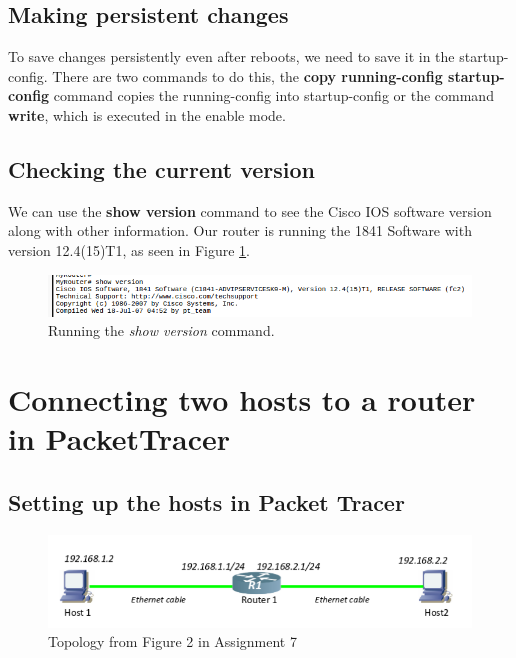 \documentclass{article}
\begin{document}
\subsection{Making persistent changes}
To save changes persistently even after reboots, we need to save it in the startup-config. There are two commands to do this, the \textbf{copy running-config startup-config} command copies the running-config into startup-config or the command \textbf{write}, which is executed in the enable mode. 

\subsection{Checking the current version}
We can use the \textbf{show version} command to see the Cisco IOS software version along with other information. Our router is running the 1841 Software with version 12.4(15)T1, as seen in Figure \ref{fig:rver}. 

\begin{figure}[h]
    \centering
    \includegraphics[width=\textwidth]{routerver}
    \caption{Running the \textit{show version} command.}
    \label{fig:rver}
\end{figure}


\section{Connecting two hosts to a router in PacketTracer}

\subsection{Setting up the hosts in Packet Tracer}

\begin{figure}[h]
    \centering
    \includegraphics[width=\textwidth]{2top}
    \caption{Topology from Figure 2 in Assignment 7}
    \label{fig:2top}
\end{figure}
\end{document}
